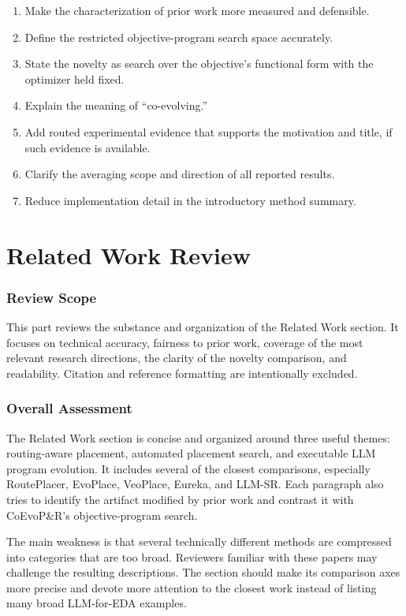 \documentclass[11pt]{article}
\begin{document}
\begin{enumerate}
  \item Make the characterization of prior work more measured and defensible.
  \item Define the restricted objective-program search space accurately.
  \item State the novelty as search over the objective's functional form with
  the optimizer held fixed.
  \item Explain the meaning of ``co-evolving.''
  \item Add routed experimental evidence that supports the motivation and
  title, if such evidence is available.
  \item Clarify the averaging scope and direction of all reported results.
  \item Reduce implementation detail in the introductory method summary.
\end{enumerate}

\clearpage
\part{Related Work Review}

\section{Review Scope}

This part reviews the substance and organization of the Related Work section.
It focuses on technical accuracy, fairness to prior work, coverage of the most
relevant research directions, the clarity of the novelty comparison, and
readability. Citation and reference formatting are intentionally excluded.

\section{Overall Assessment}

The Related Work section is concise and organized around three useful themes:
routing-aware placement, automated placement search, and executable LLM
program evolution. It includes several of the closest comparisons, especially
RoutePlacer, EvoPlace, VeoPlace, Eureka, and LLM-SR. Each paragraph also tries
to identify the artifact modified by prior work and contrast it with
CoEvoP\&R's objective-program search.

The main weakness is that several technically different methods are compressed
into categories that are too broad. Reviewers familiar with these papers may
challenge the resulting descriptions. The section should make its comparison
axes more precise and devote more attention to the closest work instead of
listing many broad LLM-for-EDA examples.
\end{document}
